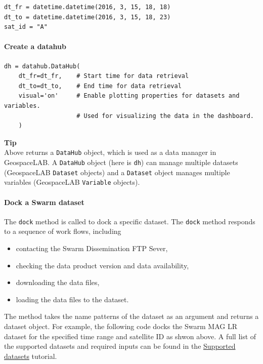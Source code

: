 \begin{verbatim}
dt_fr = datetime.datetime(2016, 3, 15, 18, 18)
dt_to = datetime.datetime(2016, 3, 15, 18, 23)
sat_id = "A"
\end{verbatim}

\paragraph{Create a datahub}

\begin{verbatim}
dh = datahub.DataHub(
    dt_fr=dt_fr,    # Start time for data retrieval
    dt_to=dt_to,    # End time for data retrieval
    visual='on'     # Enable plotting properties for datasets and variables. 
                    # Used for visualizing the data in the dashboard.
    )
\end{verbatim}

\begin{framed}
\textbf{Tip}\\
Above returns a \texttt{DataHub} object, which is used as a data manager in GeospaceLAB. A \texttt{DataHub} object (here is \texttt{dh}) can manage multiple datasets (GeospaceLAB \texttt{Dataset} objects) and a \texttt{Dataset} object manages multiple variables (GeospaceLAB \texttt{Variable} objects).
\end{framed}

\paragraph{Dock a Swarm dataset}

The \texttt{dock} method is called to dock a specific dataset. The \texttt{dock} method responds to a sequence of work flows, including

\begin{itemize}
\item contacting the Swarm Dissemination FTP Sever,
\item checking the data product version and data availability,
\item downloading the data files,
\item loading the data files to the dataset.
\end{itemize}

The method takes the name patterns of the dataset as an argument and returns a dataset object. For example, the following code docks the Swarm MAG LR dataset for the specified time range and satellite ID as shwon above. A full list of the supported datasets and required inputs can be found in the \href{/supported-datasets}{Supported datasets} tutorial.

